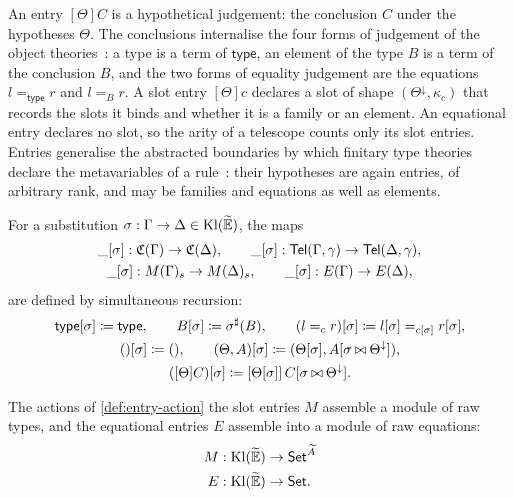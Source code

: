 An entry $[\Theta]C$ is a hypothetical judgement: the conclusion $C$ under the hypotheses $\Theta$. The conclusions internalise the four forms of judgement of the object theories~\cite{MartinLof1984}: a type is a term of $\mathsf{type}$, an element of the type $B$ is a term of the conclusion $B$, and the two forms of equality judgement are the equations $l =_{\mathsf{type}} r$ and $l =_B r$. A slot entry $[\Theta]c$ declares a slot of shape $(\Theta^{\downarrow}, \kappa_c)$ that records the slots it binds and whether it is a family or an element. An equational entry declares no slot, so the arity of a telescope counts only its slot entries. Entries generalise the abstracted boundaries by which finitary type theories declare the metavariables of a rule~\cite[\S2.1]{HaselwarterBauer2023}: their hypotheses are again entries, of arbitrary rank, and may be families and equations as well as elements.

\begin{definition}\label{def:entry-action}
    For a substitution $\sigma : \Gamma \to \Delta \in \mathrm{Kl}(\widetilde{\mathbb{E}})$, the maps
    \begin{gather*}
        \_[\sigma] : \mathfrak{C}(\Gamma) \to \mathfrak{C}(\Delta), \qquad \_[\sigma] : \mathsf{Tel}(\Gamma, \gamma) \to \mathsf{Tel}(\Delta, \gamma),\\
        \_[\sigma] : M(\Gamma)_s \to M(\Delta)_s, \qquad \_[\sigma] : E(\Gamma) \to E(\Delta),
    \end{gather*}
    are defined by simultaneous recursion:
    \begin{gather*}
        \mathsf{type}[\sigma] \coloneqq \mathsf{type}, \qquad B[\sigma] \coloneqq \sigma^\sharp(B), \qquad (l =_c r)[\sigma] \coloneqq l[\sigma] =_{c[\sigma]} r[\sigma],\\
        ()[\sigma] \coloneqq (), \qquad (\Theta, A)[\sigma] \coloneqq (\Theta[\sigma], A[\sigma \mathbin{\bowtie} \Theta^{\downarrow}]),\\
        ([\Theta]C)[\sigma] \coloneqq [\Theta[\sigma]]\, C[\sigma \mathbin{\bowtie} \Theta^{\downarrow}].
    \end{gather*}
\end{definition}

\begin{lemma}\label{lem:entry-modules}
    The actions of \cref{def:entry-action} the slot entries $M$ assemble a module of raw types, and the equational entries $E$ assemble into a module of raw equations:
    \begin{align*}
        M : \mathrm{Kl}(\widetilde{\mathbb{E}}) &\to \mathsf{Set}^{\widetilde{A}}\\
        E : \mathrm{Kl}(\widetilde{\mathbb{E}}) &\to \mathsf{Set}.
    \end{align*}  
\end{lemma}

